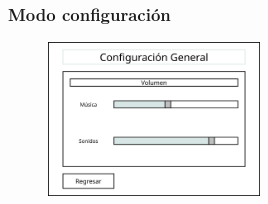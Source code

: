 \subsubsection{Modo configuración}
\begin{figure}[H]
    \centering
    \includegraphics[width=0.5\textwidth]{5-Cuerpo/Chapter5/I2.png} %
    \caption{}
    \label{fig:I2}
\end{figure}